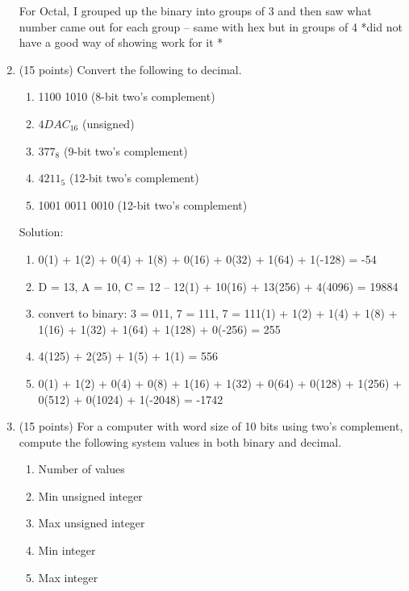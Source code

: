 \documentclass[11pt]{article}
\begin{document}
\begin{enumerate}
\begin{table}[h!]
\begin{center}
\begin{tabular}{l|c|c|r}
    \end{tabular}
  \end{center}
\end{table}

For Octal, I grouped up the binary into groups of 3 and then saw what number came out for each group -- same with hex but in groups of 4 *did not have a good way of showing work for it *


\item (15 points) Convert the following to decimal.
\begin{enumerate}
    \item 1100 1010 (8-bit two's complement)
    \item $4D AC_{16}$ (unsigned)
    \item $377_{8}$ (9-bit two’s complement)
    \item $4211_{5}$ (12-bit two’s complement)
    \item 1001 0011 0010 (12-bit two’s complement)
\end{enumerate}

Solution: 

\begin{enumerate}
	\item 0(1) + 1(2) + 0(4) + 1(8) + 0(16) + 0(32) + 1(64) + 1(-128) = -54
	\item D = 13, A = 10, C = 12 -- 12(1) + 10(16) + 13(256) + 4(4096) = 19884
	\item convert to binary: 3 = 011, 7 = 111, 7 = 111(1) + 1(2) + 1(4) + 1(8) + 1(16) + 1(32) + 1(64) + 1(128) + 0(-256) = 255 
	\item 4(125) + 2(25) + 1(5) + 1(1) = 556
	\item 0(1) + 1(2) + 0(4) + 0(8) + 1(16) + 1(32) + 0(64) + 0(128) + 1(256) + 0(512) + 0(1024) + 1(-2048) = -1742 
\end{enumerate}

\item (15 points) For a computer with word size of 10 bits using two’s complement, compute the following system values in both binary and decimal.
\begin{enumerate}
    \item Number of values
    \item Min unsigned integer
    \item Max unsigned integer
    \item Min integer
    \item Max integer
\end{enumerate}{}


\end{enumerate}
\end{document}
